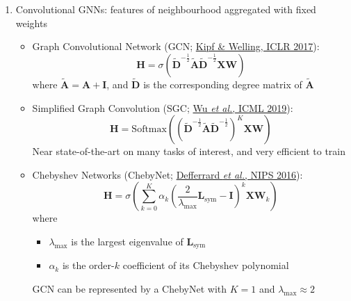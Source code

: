 \documentclass{article}
\begin{document}
\begin{enumerate}
\begin{figure}[h]
\begin{subfigure}[b]{0.3\textwidth}
			\caption{Message-passing}
			\label{fig:message-passing-gnn}
		\end{subfigure}
	\end{figure}
	\vspace*{-1.5\baselineskip}
	$$\begin{array}{ccc}
		\hspace*{-3em}\mathbf{h}_i=\phi\left(\mathbf{x}_i,\displaystyle\bigoplus_{j\in\mathcal{N}_i}c_{ij}\psi(\mathbf{x}_j)\right) & 
		\mathbf{h}_i=\phi\left(\mathbf{x}_i,\displaystyle\bigoplus_{j\in\mathcal{N}_i}a(\mathbf{x}_i,\mathbf{x}_j)\psi(\mathbf{x}_j)\right) &
		\mathbf{h}_i=\phi\left(\mathbf{x}_i,\displaystyle\bigoplus_{j\in\mathcal{N}_i}\psi(\mathbf{x}_i,\mathbf{x}_j)\right)
	\end{array}$$
	
	\item Convolutional GNNs: features of neighbourhood aggregated with fixed weights
	\begin{itemize}[topsep=0pt]
		\item Graph Convolutional Network (GCN; \href{https://openreview.net/pdf?id=SJU4ayYgl}{Kipf \& Welling, ICLR 2017}):
		$$\mathbf{H}=\sigma\left(\tilde{\mathbf{D}}^{-\frac{1}{2}}\tilde{\mathbf{A}}\tilde{\mathbf{D}}^{-\frac{1}{2}}\mathbf{X}\mathbf{W}\right)$$
		where $\tilde{\mathbf{A}}=\mathbf{A}+\mathbf{I}$, and $\tilde{\mathbf{D}}$ is the corresponding degree matrix of $\tilde{\mathbf{A}}$
		
		\item Simplified Graph Convolution (SGC; \href{http://proceedings.mlr.press/v97/wu19e/wu19e.pdf}{Wu \textit{et al.}, ICML 2019}):
		$$\mathbf{H}=\text{Softmax}\left(\left(\tilde{\mathbf{D}}^{-\frac{1}{2}}\tilde{\mathbf{A}}\tilde{\mathbf{D}}^{-\frac{1}{2}}\right)^K\mathbf{X}\mathbf{W}\right)$$
		Near state-of-the-art on many tasks of interest, and very efficient to train
		
		\item Chebyshev Networks (ChebyNet; \href{https://papers.nips.cc/paper/2016/file/04df4d434d481c5bb723be1b6df1ee65-Paper.pdf}{Defferrard \textit{et al.}, NIPS 2016}):
		$$\mathbf{H}=\sigma\left(\sum_{k=0}^K\alpha_k\left(\frac{2}{\lambda_\text{max}}\mathbf{L}_\text{sym}-\mathbf{I}\right)^k\mathbf{X}\mathbf{W}_k\right)$$
		where 
		\begin{itemize}[topsep=0pt]
			\item $\lambda_\text{max}$ is the largest eigenvalue of $\mathbf{L}_\text{sym}$ 
			\item $\alpha_k$ is the order-$k$ coefficient of its Chebyshev polynomial
		\end{itemize}
		GCN can be represented by a ChebyNet with $K=1$ and $\lambda_\text{max}\approx2$
	\end{itemize}


\end{enumerate}
\end{document}
